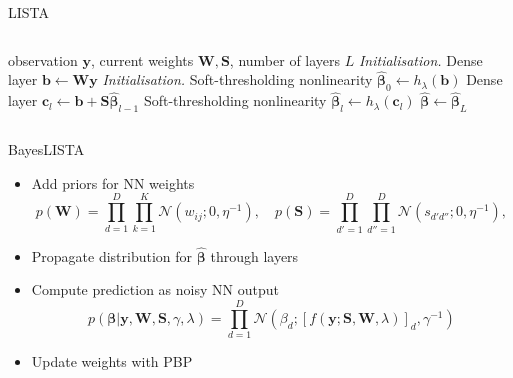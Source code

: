 \documentclass[9pt]{beamer}
\begin{document}
\begin{frame}{LISTA}
\begin{columns}
\begin{column}{0.67\textwidth}
    \begin{algorithmic}[1]
      \REQUIRE observation $\mathbf{y}$, current weights $\mathbf{W}, \mathbf{S}$, number of layers $L$
      \STATE \textit{Initialisation.} Dense layer $\mathbf{b} \gets \mathbf{W}\mathbf{y}$
      \STATE \textit{Initialisation.} Soft-thresholding nonlinearity $\widehat{\boldsymbol\beta}_0 \gets h_\lambda(\mathbf{b})$
      \STATE Dense layer $\mathbf{c}_l \gets \mathbf{b} + \mathbf{S}\widehat{\boldsymbol\beta}_{l-1}$
      \STATE Soft-thresholding nonlinearity $\widehat{\boldsymbol\beta}_{l} \gets h_\lambda(\mathbf{c}_l)$
      \ENDFOR
      \RETURN $\widehat{\boldsymbol\beta} \gets \widehat{\boldsymbol\beta}_{L}$
    \end{algorithmic}
        \end{column}
      \end{columns}
\end{frame}

\begin{frame}{BayesLISTA}
  \begin{itemize}
    \item Add priors for NN weights
    \begin{equation*}
      p(\mathbf{W}) = \prod_{d=1}^D\prod_{k=1}^K \mathcal{N}(w_{ij} ; 0, \eta^{-1}), \quad
      p(\mathbf{S}) = \prod_{d'=1}^D\prod_{d''=1}^D \mathcal{N}(s_{d'd''} ; 0, \eta^{-1}),
    \end{equation*}
    \item Propagate distribution for $\widehat{\boldsymbol\beta}$ through layers
    \item Compute prediction as noisy NN output
    \begin{equation*}
      p(\mathbf{\boldsymbol\beta}| \mathbf{y}, \mathbf{W}, \mathbf{S}, \gamma, \lambda)
      = \prod_{d=1}^D\mathcal{N}\left(\beta_d; [f(\mathbf{y} ; \mathbf{S}, \mathbf{W}, \lambda)]_d, \gamma^{-1}\right)
    \end{equation*}
    \item Update weights with PBP
  \end{itemize}
  \end{frame}
\end{document}
